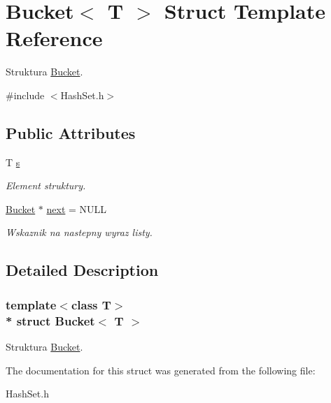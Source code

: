 \hypertarget{struct_bucket}{}\section{Bucket$<$ T $>$ Struct Template Reference}
\label{struct_bucket}


Struktura \hyperlink{struct_bucket}{Bucket}.  




{\ttfamily \#include $<$Hash\+Set.\+h$>$}

\subsection*{Public Attributes}
\begin{DoxyCompactItemize}
\item 
T \hyperlink{struct_bucket_a3d67ed4728216cb914ce1c06857572e5}{s}\hypertarget{struct_bucket_a3d67ed4728216cb914ce1c06857572e5}{}\label{struct_bucket_a3d67ed4728216cb914ce1c06857572e5}

\begin{DoxyCompactList}\small\item\em Element struktury. \end{DoxyCompactList}\item 
\hyperlink{struct_bucket}{Bucket} $\ast$ \hyperlink{struct_bucket_a5871192f889caa46c0f715a5a0941633}{next} = N\+U\+LL\hypertarget{struct_bucket_a5871192f889caa46c0f715a5a0941633}{}\label{struct_bucket_a5871192f889caa46c0f715a5a0941633}

\begin{DoxyCompactList}\small\item\em Wskaznik na nastepny \textquotesingle{}wyraz\textquotesingle{} listy. \end{DoxyCompactList}\end{DoxyCompactItemize}


\subsection{Detailed Description}
\subsubsection*{template$<$class T$>$\\*
struct Bucket$<$ T $>$}

Struktura \hyperlink{struct_bucket}{Bucket}. 

The documentation for this struct was generated from the following file\+:\begin{DoxyCompactItemize}
\item 
Hash\+Set.\+h\end{DoxyCompactItemize}

